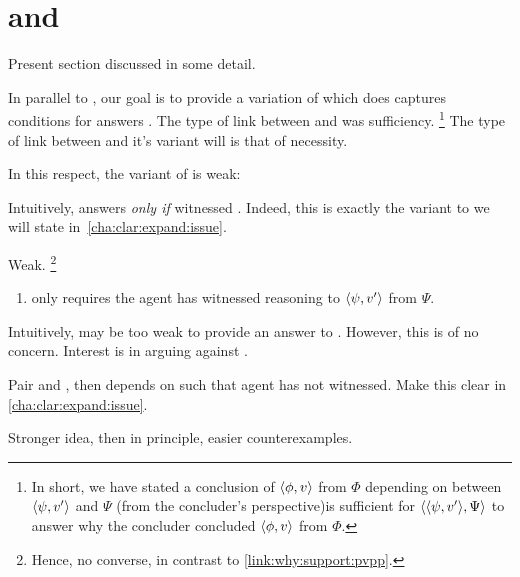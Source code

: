 \section{ and \qHow{}}
\label{sec:overview:reasoning}
\label{cha:clar:expand:qHow}

\begin{note}[Introduction]
  Present section discussed \qHowV{} in some detail.
\end{note}

\begin{note}

  In parallel to \qWhyV{}, our goal is to provide a variation of \qHow{} which does captures conditions for answers \qHow{}.
  The type of link between \qWhyV{} and \qWhy{} was sufficiency.%
  \footnote{
    In short, we have stated a conclusion of \(\langle \phi, v \rangle\) from \(\Phi\) {\color{red} depending} on \support{} between \(\langle \psi, v' \rangle\) and \(\Psi\) (from the concluder's perspective)is sufficient for \(\langle \langle \psi, v' \rangle, \Psi \rangle\) to answer why the concluder concluded \(\langle \phi, v \rangle\) from \(\Phi\).
  }
  The type of link between \qHow{} and it's variant will is that of necessity.

  In this respect, the variant of \qHow{} is weak:

  \questionHowV*

  
  Intuitively, \support{} answers \qWhyV{} \emph{only if} witnessed \support{}.
  Indeed, this is exactly the variant to \issueInclusion{} we will state in~\autoref{cha:clar:expand:issue}.
\end{note}


\begin{note}[Weak]
  Weak.%
  \footnote{
    Hence, no converse, in contrast to \autoref{link:why:support:pvpp}.
  }
  \begin{enumerate}
  \item
    \qHowV{} only requires the agent has witnessed reasoning to \(\langle \psi, v' \rangle\) from \(\Psi\).
  \end{enumerate}

  Intuitively, may be too weak to provide an answer to \qWhy{}.
  However, this is of no concern.
  Interest is in arguing against \issueInclusion{}.

  Pair \qWhyV{} and \qHowV{}, then depends on \support{} such that agent has not witnessed.
  Make this clear in \autoref{cha:clar:expand:issue}.

  Stronger idea, then in principle, easier counterexamples.
\end{note}


